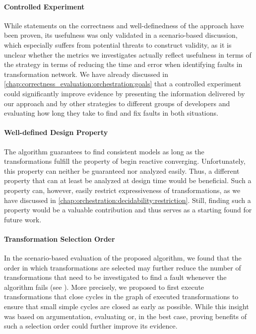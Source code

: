 \paragraph{Controlled Experiment}
\label{chap:futurework:correctness:orchestration:experiment}
While statements on the correctness and well-definedness of the approach have been proven, its usefulness was only validated in a scenario-based discussion, which especially suffers from potential threats to construct validity, as it is unclear whether the metrics we investigates actually reflect usefulness in terms of the strategy in terms of reducing the time and error when identifying faults in transformation network.
We have already discussed in \autoref{chap:correctness_evaluation:orchestration:goals} that a controlled experiment could significantly improve evidence by presenting the information delivered by our approach and by other strategies to different groups of developers and evaluating how long they take to find and fix faults in both situations.

\paragraph{Well-defined Design Property}
\label{chap:futurework:correctness:orchestration:property}
The algorithm guarantees to find consistent models as long as the transformations fulfill the property of begin reactive converging.
Unfortunately, this property can neither be guaranteed nor analyzed easily.
Thus, a different property that can at least be analyzed at design time would be beneficial.
Such a property can, however, easily restrict expressiveness of transformations, as we have discussed in \autoref{chap:orchestration:decidability:restriction}.
Still, finding such a property would be a valuable contribution and thus serves as a starting found for future work.

\paragraph{Transformation Selection Order}
\label{chap:futurework:correctness:orchestration:selection}
In the scenario-based evaluation of the proposed algorithm, we found that the order in which transformations are selected may further reduce the number of transformations that need to be investigated to find a fault whenever the algorithm fails (see \label{chap:correctness_evaluation:orchestration:discussion}).
More precisely, we proposed to first execute transformations that close cycles in the graph of executed transformations to ensure that small simple cycles are closed as early as possible.
While this insight was based on argumentation, evaluating or, in the best case, proving benefits of such a selection order could further improve its evidence.

